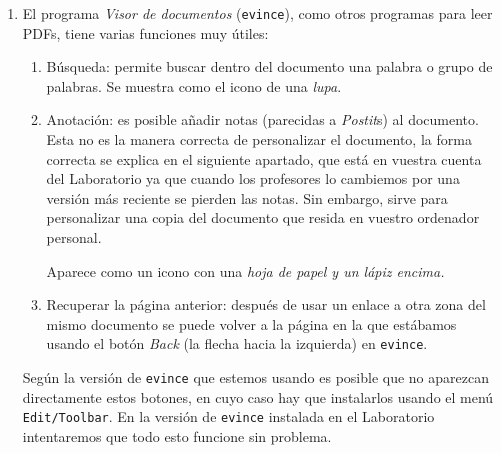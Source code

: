 \begin{appendices}
\begin{enumerate}
\begin{enumerate}
\item Tambi\'en hay \hyperref[prologo]{enlaces a otras zonas de este mismo documento}. Podemos recuparar la p\'agina en la que est\'abamos usando el bot\'on {\itshape Back} (la flecha hacia la izquierda) en {\tt evince}.

\item Por \'ultimo, hay \href{http://sage.mat.uam.es:8888/home/pub/0/}{enlaces} que nos llevan directamente a hojas de trabajo
de {\sage} que, como hemos visto se abren dentro del navegador (en nuestro caso
\verb|Iceweasel|). Estos enlaces a hojas de trabajo permiten ver las hojas pero
no
modificarlas o ejecutarlas. Sin embargo, tienen un enlace ({\itshape Download})
en la parte de arriba
que permite descargarlas en nuestro ordenador, y, una vez descargadas,  podemos
\hyperref[subir]{subirlas} a nuestra copia local de {\sage}.  

\end{enumerate}
\item El programa {\itshape Visor de documentos} ({\tt evince}), como otros programas para leer PDFs, tiene varias funciones muy \'utiles:
\begin{enumerate}
	\item {\sc B\'usqueda:} permite buscar dentro del documento una palabra o grupo de palabras. Se muestra como el icono de una {\itshape lupa}.
	\item {\sc Anotaci\'on:} es posible a\~nadir notas (parecidas a {\itshape Postit}s) al documento. Esta no es la manera correcta de personalizar el documento, la forma correcta se explica en el siguiente apartado,  que est\'a en vuestra cuenta del Laboratorio ya que cuando los profesores lo cambiemos por una versi\'on m\'as reciente se pierden las notas. Sin embargo, sirve para personalizar una copia del documento que resida en vuestro ordenador personal. 
	
	Aparece como un icono con una {\itshape hoja de papel y un l\'apiz encima.} 
	
	\item {\sc Recuperar la p\'agina anterior:} despu\'es de usar un enlace a otra zona del mismo documento se puede volver a la p\'agina en la
	que est\'abamos usando el bot\'on {\itshape Back} (la flecha hacia la izquierda) en {\tt evince}.
\end{enumerate}


Seg\'un la versi\'on de {\tt evince} que estemos usando es posible que no aparezcan directamente estos botones, en cuyo caso hay que instalarlos usando el men\'u {\tt Edit/Toolbar}. En la versi\'on de {\tt evince} instalada en el Laboratorio intentaremos que todo esto funcione sin problema.






\end{enumerate}
\end{appendices}
